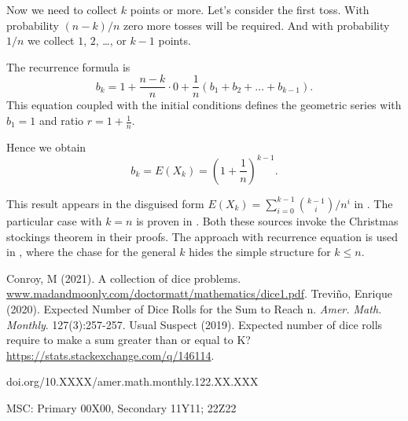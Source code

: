 \documentclass{article}
\theoremstyle{plain}
\begin{document}
\begin{filler}
Now we need to collect $k$ points or more. Let's consider the first toss.
With probability $(n - k)/n$ zero more tosses will be required. 
And with probability $1/n$ we collect $1$, $2$, \ldots, or $k-1$ points.

The recurrence formula is
\[
b_k = 1 + \frac{n - k}{n} \cdot 0 + \frac{1}{n} (b_1 + b_2 + \ldots + b_{k-1}).
\]
This equation coupled with the initial conditions defines the geometric series with $b_1 = 1$ and ratio $r = 1 + \frac{1}{n}$.

Hence we obtain
\[
b_k = E(X_k) = \left( 1 + \frac{1}{n} \right)^{k-1}.
\]


This result appears in the disguised form $E(X_k) = \sum_{i=0}^{k-1} \binom{k-1}{i} / n^i$ in \cite{conroy2021collection}.
The particular case with $k=n$ is proven in \cite{trevino2020expected}.
Both these sources invoke the Christmas stockings theorem in their proofs.
The approach with recurrence equation is used in \cite{146114}, 
where the chase for the general $k$ hides the simple structure for $k\leq n$. 


\begin{thebibliography}{1}
 Conroy, M (2021). A collection of dice problems. \url{www.madandmoonly.com/doctormatt/mathematics/dice1.pdf}.
 Trevi{\~n}o, Enrique (2020). Expected Number of Dice Rolls for the Sum to Reach n. \textit{Amer. Math. Monthly}. 127(3):257-257.
 Usual Suspect (2019). Expected number of dice rolls require to make a sum greater than or equal to K? \url{https://stats.stackexchange.com/q/146114}.
\end{thebibliography}




\bigskip
\footnoterule
\footnotesize{doi.org/10.XXXX/amer.math.monthly.122.XX.XXX}

\footnotesize{MSC: Primary 00X00, Secondary 11Y11; 22Z22}

\end{filler}
\end{document}

